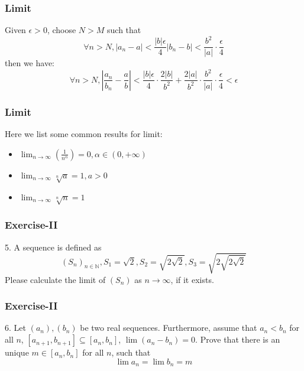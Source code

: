 \documentclass[12pt, t]{beamer}
\begin{document}
\begin{frame}
    \frametitle{Limit}
\hspace{1em} Given $\epsilon >0$, choose $N>M$ such that 
\begin{equation*}
    \forall n> N, |a_n-a|<\frac{|b|\epsilon}{4}|b_n-b|<\frac{b^2}{|a|}\cdot \frac{\epsilon}{4}
\end{equation*} 
then we have:
\begin{equation*}
    \forall n>N, |\frac{a_n}{b_n}-\frac{a}{b}|<\frac{|b|\epsilon}{4}\cdot\frac{2|b|}{b^2}+\frac{2|a|}{b^2}\cdot \frac{b^2}{|a|}\cdot \frac{\epsilon}{4}<\epsilon
\end{equation*}
\end{frame}

\begin{frame}
    \frametitle{Limit}
Here we list some common results for limit:
\begin{itemize}
    \item $\lim_{n\rightarrow \infty} (\frac{1}{n^\alpha})=0,\alpha \in (0,+\infty)$
    \item $\lim_{n\rightarrow \infty} \sqrt[n]{a}=1, a>0$
    \item $\lim_{n\rightarrow \infty} \sqrt[n]{n}=1$
\end{itemize}    
\end{frame}

\begin{frame}
    \frametitle{Exercise-II}
5. A sequence is defined as
\begin{equation*}
    (S_n)_{n\in\mathbb{N}}, S_1=\sqrt{2}, S_2=\sqrt{2\sqrt{2}}, S_3=\sqrt{2\sqrt{2\sqrt{2}}}
\end{equation*}
Please calculate the limit of $(S_n)$ as $n\rightarrow \infty$, if it exists.
\end{frame}

\begin{frame}
    \frametitle{Exercise-II}
6. Let $(a_n),(b_n)$ be two real sequences. Furthermore, assume that $a_n<b_n$
for all $n$, $[a_{n+1}, b_{n+1}]\subseteq [a_n,b_n]$, $\lim (a_n-b_n)=0$. Prove that there 
is an unique $m\in [a_n,b_n]$ for all $n$, such that 
\begin{equation*}
    \lim a_n=\lim b_n=m
\end{equation*}
\end{frame}
\end{document}
